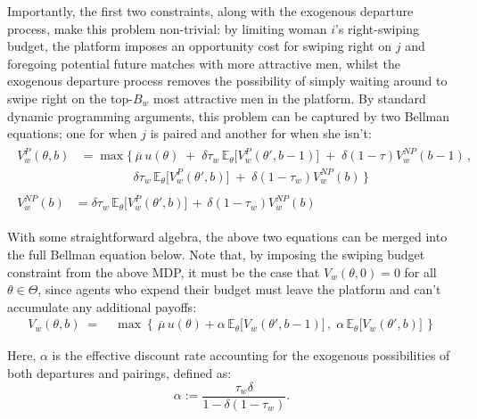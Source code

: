 Importantly, the first two constraints, along with the exogenous departure process, make this problem non-trivial: by limiting woman $i$'s right-swiping budget, the platform imposes an opportunity cost for swiping right on $j$ and foregoing potential future matches with more attractive men, whilst the exogenous departure process removes the possibility of simply waiting around to swipe right on the top-$B_w$ most attractive men in the platform. 
By standard dynamic programming arguments, this problem can be captured by two Bellman equations; one for when $j$ is paired and another for when she isn't: 
\begin{align}
    \begin{split} 
        V^{P}_w(\theta,b) &=\max \Big\{ \, \overline{\mu}\, u(\theta) \;+\; \delta \tau_w \,\mathbb{E}_\theta \Big[V^P_w(\theta', b-1)\Big] \;+\; \delta (1-\tau)V^{NP}_w(b-1) \, ,\\[6pt]
        & \quad\quad\quad\quad\;\delta \tau_w \, \mathbb{E}_\theta\Big[ V^P_w(\theta', b) \Big] \;+\; \delta (1-\tau_w) V^{NP}_w(b) \, \Big\}
    \end{split}\\[10pt]
    \begin{split}
        V^{NP}_w(b) &= {}\delta \tau_w \,\mathbb{E}_\theta \Big[ V^P_w(\theta', b)\Big] \,+\, \delta (1-\tau_w) V^{NP}_w(b)
    \end{split} 
\end{align} 

With some straightforward algebra, the above two equations can be merged into the full Bellman equation below. Note that, by imposing the swiping budget constraint from the above MDP, it must be the case that $V_w(\theta, 0)=0$ for all $\theta \in \Theta$, since agents who expend their budget must leave the platform and can't accumulate any additional payoffs: 
\begin{equation}\label{eq:full bellman}
    \begin{aligned} 
        V_w(\theta,b) \;=\;&\max\left\{\,\overline{\mu} \, u(\theta) +\alpha \,\mathbb{E}_\theta \Big[V_w(\theta', b-1)\Big]\,,\; \alpha\,\mathbb{E}_\theta \Big[ V_w(\theta', b)\Big]\,\right\}
    \end{aligned}
\end{equation}

Here, $\alpha$ is the effective discount rate accounting for the exogenous possibilities of both departures and pairings, defined as:  
\begin{equation*}
\alpha:=\frac{\tau_w\delta}{1-\delta(1-\tau_w)}.
\end{equation*}

